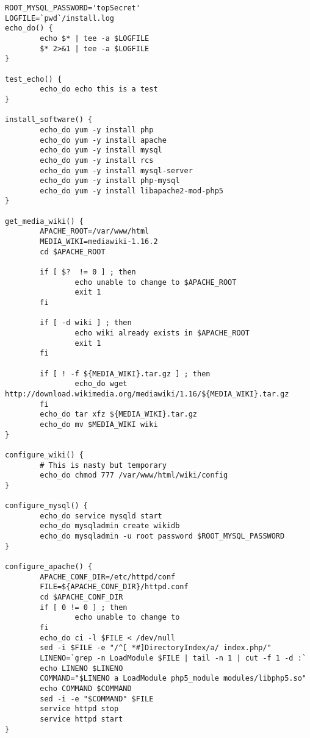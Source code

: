 \begin{verbatim}
ROOT_MYSQL_PASSWORD='topSecret'     
LOGFILE=`pwd`/install.log           
echo_do() {                         
        echo $* | tee -a $LOGFILE   
        $* 2>&1 | tee -a $LOGFILE   
}                                   

test_echo() {
        echo_do echo this is a test
}                                  

install_software() {
        echo_do yum -y install php
        echo_do yum -y install apache
        echo_do yum -y install mysql 
        echo_do yum -y install rcs   
        echo_do yum -y install mysql-server 
        echo_do yum -y install php-mysql    
        echo_do yum -y install libapache2-mod-php5
}                                                 

get_media_wiki() {
        APACHE_ROOT=/var/www/html 
        MEDIA_WIKI=mediawiki-1.16.2
        cd $APACHE_ROOT            

        if [ $?  != 0 ] ; then
                echo unable to change to $APACHE_ROOT
                exit 1                               
        fi                                           

        if [ -d wiki ] ; then
                echo wiki already exists in $APACHE_ROOT
                exit 1                                  
        fi                                              

        if [ ! -f ${MEDIA_WIKI}.tar.gz ] ; then
                echo_do wget http://download.wikimedia.org/mediawiki/1.16/${MEDIA_WIKI}.tar.gz
        fi                                                                                    
        echo_do tar xfz ${MEDIA_WIKI}.tar.gz                                                  
        echo_do mv $MEDIA_WIKI wiki                                                           
}                                                                                             

configure_wiki() {
        # This is nasty but temporary
        echo_do chmod 777 /var/www/html/wiki/config
}                                                  

configure_mysql() {
        echo_do service mysqld start
        echo_do mysqladmin create wikidb
        echo_do mysqladmin -u root password $ROOT_MYSQL_PASSWORD 
}                                                                

configure_apache() {
        APACHE_CONF_DIR=/etc/httpd/conf
        FILE=${APACHE_CONF_DIR}/httpd.conf
        cd $APACHE_CONF_DIR               
        if [ 0 != 0 ] ; then              
                echo unable to change to  
        fi                                
        echo_do ci -l $FILE < /dev/null
        sed -i $FILE -e "/^[ *#]DirectoryIndex/a/ index.php/"
        LINENO=`grep -n LoadModule $FILE | tail -n 1 | cut -f 1 -d :`
        echo LINENO $LINENO
        COMMAND="$LINENO a LoadModule php5_module modules/libphp5.so"
        echo COMMAND $COMMAND
        sed -i -e "$COMMAND" $FILE
        service httpd stop
        service httpd start
}


\end{verbatim}
